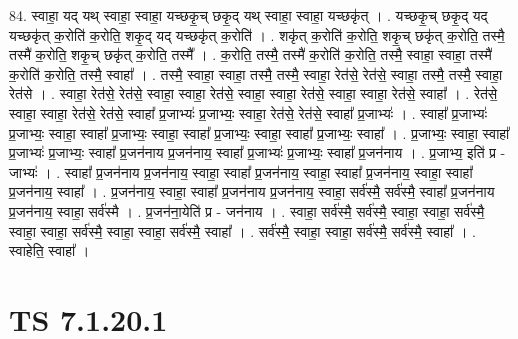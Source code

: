 \documentclass[17pt]{extarticle}
\begin{document}
84. स्वाहा॒ यद् यथ् स्वाहा॒ स्वाहा॒ यच्छकृ॒च् छकृ॒द् यथ् स्वाहा॒ स्वाहा॒ यच्छकृ॑त् । . यच्छकृ॒च् छकृ॒द् यद् यच्छकृ॑त् क॒रोति॑ क॒रोति॒ शकृ॒द् यद् यच्छकृ॑त् क॒रोति॑ । . शकृ॑त् क॒रोति॑ क॒रोति॒ शकृ॒च् छकृ॑त् क॒रोति॒ तस्मै॒ तस्मै॑ क॒रोति॒ शकृ॒च् छकृ॑त् क॒रोति॒ तस्मै᳚ । . क॒रोति॒ तस्मै॒ तस्मै॑ क॒रोति॑ क॒रोति॒ तस्मै॒ स्वाहा॒ स्वाहा॒ तस्मै॑ क॒रोति॑ क॒रोति॒ तस्मै॒ स्वाहा᳚ । . तस्मै॒ स्वाहा॒ स्वाहा॒ तस्मै॒ तस्मै॒ स्वाहा॒ रेत॑से॒ रेत॑से॒ स्वाहा॒ तस्मै॒ तस्मै॒ स्वाहा॒ रेत॑से । . स्वाहा॒ रेत॑से॒ रेत॑से॒ स्वाहा॒ स्वाहा॒ रेत॑से॒ स्वाहा॒ स्वाहा॒ रेत॑से॒ स्वाहा॒ स्वाहा॒ रेत॑से॒ स्वाहा᳚ । . रेत॑से॒ स्वाहा॒ स्वाहा॒ रेत॑से॒ रेत॑से॒ स्वाहा᳚ प्र॒जाभ्यः॑ प्र॒जाभ्यः॒ स्वाहा॒ रेत॑से॒ रेत॑से॒ स्वाहा᳚ प्र॒जाभ्यः॑ । . स्वाहा᳚ प्र॒जाभ्यः॑ प्र॒जाभ्यः॒ स्वाहा॒ स्वाहा᳚ प्र॒जाभ्यः॒ स्वाहा॒ स्वाहा᳚ प्र॒जाभ्यः॒ स्वाहा॒ स्वाहा᳚ प्र॒जाभ्यः॒ स्वाहा᳚ । . प्र॒जाभ्यः॒ स्वाहा॒ स्वाहा᳚ प्र॒जाभ्यः॑ प्र॒जाभ्यः॒ स्वाहा᳚ प्र॒जन॑नाय प्र॒जन॑नाय॒ स्वाहा᳚ प्र॒जाभ्यः॑ प्र॒जाभ्यः॒ स्वाहा᳚ प्र॒जन॑नाय । . प्र॒जाभ्य॒ इति॑ प्र - जाभ्यः॑ । . स्वाहा᳚ प्र॒जन॑नाय प्र॒जन॑नाय॒ स्वाहा॒ स्वाहा᳚ प्र॒जन॑नाय॒ स्वाहा॒ स्वाहा᳚ प्र॒जन॑नाय॒ स्वाहा॒ स्वाहा᳚ प्र॒जन॑नाय॒ स्वाहा᳚ । . प्र॒जन॑नाय॒ स्वाहा॒ स्वाहा᳚ प्र॒जन॑नाय प्र॒जन॑नाय॒ स्वाहा॒ सर्व॑स्मै॒ सर्व॑स्मै॒ स्वाहा᳚ प्र॒जन॑नाय प्र॒जन॑नाय॒ स्वाहा॒ सर्व॑स्मै । . प्र॒जन॑ना॒येति॑ प्र - जन॑नाय । . स्वाहा॒ सर्व॑स्मै॒ सर्व॑स्मै॒ स्वाहा॒ स्वाहा॒ सर्व॑स्मै॒ स्वाहा॒ स्वाहा॒ सर्व॑स्मै॒ स्वाहा॒ स्वाहा॒ सर्व॑स्मै॒ स्वाहा᳚ । . सर्व॑स्मै॒ स्वाहा॒ स्वाहा॒ सर्व॑स्मै॒ सर्व॑स्मै॒ स्वाहा᳚ । . स्वाहेति॒ स्वाहा᳚ । \newline
\pagebreak
{}

\section{ TS 7.1.20.1 }
\end{document}
